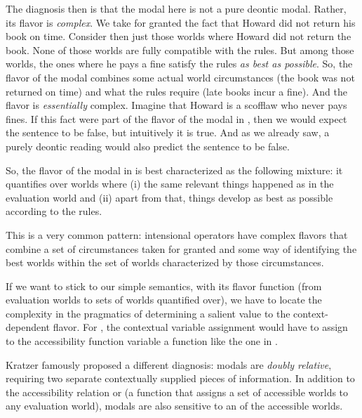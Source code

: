 The diagnosis then is that the modal here is not a pure deontic modal. Rather,
its flavor is \emph{complex}. We take for granted the fact that Howard did not
return his book on time. Consider then just those worlds where Howard did not
return the book. None of those worlds are fully compatible with the rules. But
among those worlds, the ones where he pays a fine satisfy the rules \emph{as
  best as possible}. So, the flavor of the modal combines some actual world
circumstances (the book was not returned on time) and what the rules require
(late books incur a fine). And the flavor is \emph{essentially} complex. Imagine
that Howard is a scofflaw who never pays fines. If this fact were part of the
flavor of the modal in \Last, then we would expect the sentence to be false, but
intuitively it is true. And as we already saw, a purely deontic reading would
also predict the sentence to be false.

So, the flavor of the modal in \Last is best characterized as the following
mixture: it quantifies over worlds where (i) the same relevant things happened
as in the evaluation world and (ii) apart from that, things develop as best as
possible according to the rules.

This is a very common pattern: intensional operators have complex flavors that
combine a set of circumstances taken for granted and some way of identifying the
best worlds within the set of worlds characterized by those circumstances.

If we want to stick to our simple semantics, with its flavor function (from
evaluation worlds to sets of worlds quantified over), we have to locate the
complexity in the pragmatics of determining a salient value to the
context-dependent flavor. For \Last, the contextual variable assignment would
have to assign to the accessibility function variable a function like the one in
\Last.

%
Kratzer famously proposed a different diagnosis: modals are \emph{doubly
  relative}, requiring two separate contextually supplied pieces of information.
In addition to the accessibility relation or  (a function that
assigns a set of accessible worlds to any evaluation world), modals are also
sensitive to an  of the accessible worlds.

